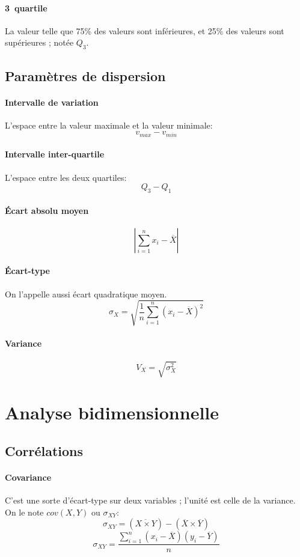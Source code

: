 \documentclass[10pt,a4paper,french]{article}
\begin{document}
\paragraph{3\ieme~quartile}
La valeur telle que 75\% des valeurs sont inférieures, et 25\% des valeurs sont supérieures ; notée $Q_3$.

\subsection{Paramètres de dispersion}

\paragraph{Intervalle de variation}
L'espace entre la valeur maximale et la valeur minimale: \[ v_{max} - v_{min} \]

\paragraph{Intervalle inter-quartile}
L'espace entre les deux quartiles: \[ Q_3 - Q_1 \]

\paragraph{Écart absolu moyen}
\[ \left\vert \sum_{i=1}^n x_i - \overline{X} \right\vert \]

\paragraph{Écart-type} On l'appelle aussi écart quadratique moyen.
\[ \sigma_X = \sqrt{\frac{1}{n} \sum_{i=1}^n (x_i - \overline{X})^2} \]

\paragraph{Variance}
\[ V_X = \sqrt{\sigma_X^2} \]

\section{Analyse bidimensionnelle}

\subsection{Corrélations}

\paragraph{Covariance}
C'est une sorte d'écart-type sur deux variables ; l'unité est celle de la variance. On le note $cov(X, Y)$ ou $\sigma_{XY}$:
\[ \sigma_{X Y} = (\overline{X \times Y}) - (\overline{X} \times \overline{Y}) \]
\[ \sigma_{X Y} = \frac{\sum_{i=1}^n (x_i - \overline{X}) (y_i - \overline{Y})}{n} \]
\end{document}
